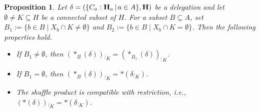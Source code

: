 \documentclass[10pt,a4paper]{amsart}
\newtheorem{proposition}{Proposition}
\newcommand{\inc}{\subseteq}
\newcommand{\inter}{\cap}
\newcommand{\restrconstr}[2]{{#1}_{{}^\lceil {#2}}}
\newcommand{\set}[1]{\{#1\}}
\newcommand{\setc}[2]{\set{#1 \mid #2}}
\begin{document}
\begin{proposition} \label{shuffle-restriction}
Let $\delta = (\{C_a:{\bf H}_a\,|\, a\in A\},{\bf H})$  be a delegation and let $\emptyset\neq K\subseteq H$ be a connected subset of $H$. For a subset $B\inc A$, set  $B_1:=\setc{b\in B}{X_b\inter K\neq\emptyset}$ and
$B_2:=\setc{b\in B}{X_b\inter K=\emptyset}$. Then the following properties hold.
\begin{itemize}
\item[{\em (P$_1$)}] {\it If $B_1\neq\emptyset$, then $\restrconstr{(\ast_B(\delta))}{K}=\restrconstr{(\ast_{B_1}(\delta))}{K}$.}
\item[{\em (P$_2$)}] {\it If $B_1=\emptyset$, then $\restrconstr{(\ast_B(\delta))}{K}=\ast(\restrconstr{\delta}{K})$.}
\item[{\em (P)}] The shuffle product is compatible with restriction, i.e., $\restrconstr{(\ast(\delta))}{K}=\ast(\restrconstr{\delta}{K})$.
\end{itemize}
\end{proposition}
\end{document}
